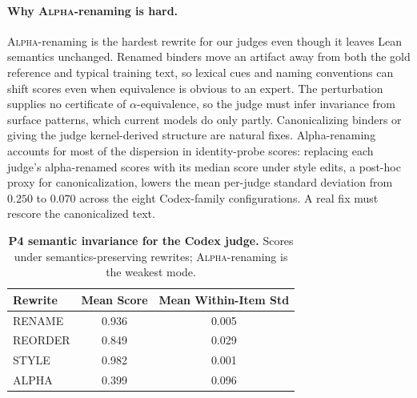 \paragraph{Why \textsc{Alpha}-renaming is hard.}
\textsc{Alpha}-renaming is the hardest rewrite for our judges even though it leaves Lean semantics unchanged.
Renamed binders move an artifact away from both the gold reference and typical training text, so lexical cues and naming conventions can shift scores even when equivalence is obvious to an expert.
The perturbation supplies no certificate of \(\alpha\)-equivalence, so the judge must infer invariance from surface patterns, which current models do only partly.
Canonicalizing binders or giving the judge kernel-derived structure are natural fixes.
Alpha-renaming accounts for most of the dispersion in identity-probe scores: replacing each judge's alpha-renamed scores with its median score under style edits, a post-hoc proxy for canonicalization, lowers the mean per-judge standard deviation from \(0.250\) to \(0.070\) across the eight Codex-family configurations.
A real fix must rescore the canonicalized text.

\begin{table}[t]
  \centering
  \scriptsize
  \begin{tabular}{lcc}
    \toprule
    \textbf{Rewrite} & \textbf{Mean Score} & \textbf{Mean Within-Item Std} \\
    \midrule
    RENAME           & 0.936               & 0.005                         \\
    REORDER          & 0.849               & 0.029                         \\
    STYLE            & 0.982               & 0.001                         \\
    ALPHA            & 0.399               & 0.096                         \\
    \bottomrule
  \end{tabular}
  \caption{\textbf{P4 semantic invariance for the Codex judge.} Scores under semantics-preserving rewrites; \textsc{Alpha}-renaming is the weakest mode.}
  \label{tab:codex_invariance_variants}
\end{table}

